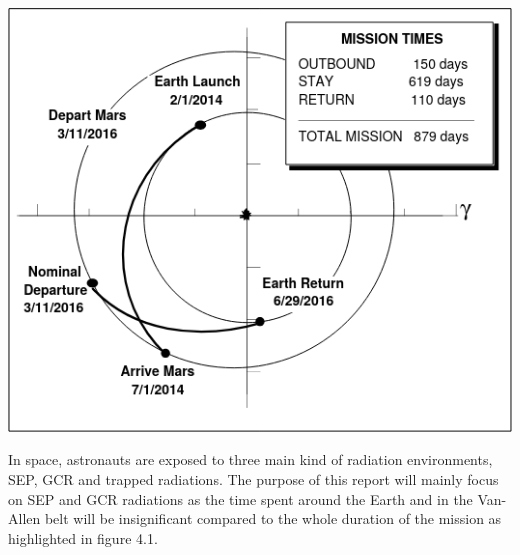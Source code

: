 \documentclass[12pt,a4paper]{report}
\begin{document}
\begin{minipage}[b]{0.5\linewidth}
\centering
\includegraphics[width=1\textwidth]{img/optimised traj.png}
\end{minipage} 
\hfill
\begin{minipage}[b]{0.35\linewidth}
In space, astronauts are exposed to three main kind of radiation environments, SEP, GCR and trapped radiations. The purpose of this report will mainly focus on SEP and GCR radiations as the time spent around the Earth and in the Van-Allen belt will be insignificant compared to the whole duration of the mission as highlighted in figure 4.1.
\end{minipage}
\end{document}
